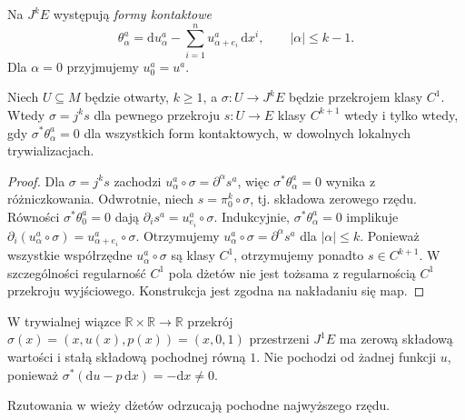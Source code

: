 Na $J^kE$ występują \emph{formy kontaktowe}
\[
 \theta^a_\alpha=\mathrm d u^a_\alpha
 -\sum_{i=1}^n u^a_{\alpha+e_i}\,\mathrm d x^i,
 \qquad |\alpha|\le k-1.
\]
Dla $\alpha=0$ przyjmujemy $u_0^a=u^a$.

\begin{twierdzenie}
\label{thm:dzety-contact}
Niech $U\subseteq M$ będzie otwarty, $k\ge1$,
a $\sigma:U\to J^kE$ będzie przekrojem klasy $C^1$.
Wtedy $\sigma=j^ks$ dla pewnego przekroju
$s:U\to E$ klasy $C^{k+1}$ wtedy i tylko wtedy, gdy
$\sigma^*\theta^a_\alpha=0$ dla wszystkich form
kontaktowych, w dowolnych lokalnych trywializacjach.
\end{twierdzenie}
\begin{proof}
Dla $\sigma=j^ks$ zachodzi
$u^a_\alpha\circ\sigma=\partial^\alpha s^a$,
więc $\sigma^*\theta^a_\alpha=0$ wynika z różniczkowania.
Odwrotnie, niech $s=\pi_0^k\circ\sigma$, tj. składowa
zerowego rzędu. Równości $\sigma^*\theta^a_0=0$ dają
$\partial_i s^a=u^a_{e_i}\circ\sigma$. Indukcyjnie,
$\sigma^*\theta^a_\alpha=0$ implikuje
$\partial_i(u^a_\alpha\circ\sigma)
=u^a_{\alpha+e_i}\circ\sigma$. Otrzymujemy
$u^a_\alpha\circ\sigma=\partial^\alpha s^a$
dla $|\alpha|\le k$. Ponieważ wszystkie współrzędne $u^a_\alpha\circ\sigma$
są klasy $C^1$, otrzymujemy ponadto $s\in C^{k+1}$.
W szczególności regularność $C^1$ pola dżetów nie jest
tożsama z regularnością $C^1$ przekroju wyjściowego.
Konstrukcja jest zgodna na nakładaniu się map.
\end{proof}

\begin{przyklad}
W trywialnej wiązce $\mathbb R\times\mathbb R\to\mathbb R$
przekrój $\sigma(x)=(x,u(x),p(x))=(x,0,1)$
przestrzeni $J^1E$ ma zerową składową wartości i
stałą składową pochodnej równą $1$. Nie pochodzi od
żadnej funkcji $u$, ponieważ
$\sigma^*(\mathrm du-p\,\mathrm dx)=-\mathrm dx\ne0$.
\end{przyklad}

\begin{center}

{\small Rzutowania w wieży dżetów odrzucają pochodne najwyższego rzędu.}
\end{center}


